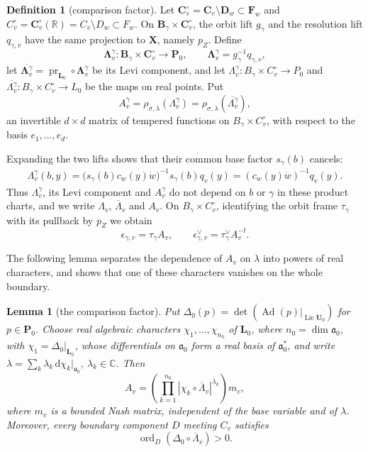 \documentclass[a4paper,12pt]{amsart}
\numberwithin{equation}{section}
\newtheorem{lemma}[theorem]{Lemma}
\theoremstyle{definition}
\newtheorem{definition}[theorem]{Definition}
\theoremstyle{remark}
\newcommand{\pP}{\mathbf P}
\newcommand{\lL}{\mathbf L}
\newcommand{\U}{\mathbf U}
\newcommand{\X}{\mathbf X}
\newcommand{\F}{\mathbf F}
\newcommand{\D}{\mathbf D}
\newcommand{\B}{\mathbf B}
\newcommand{\R}{\mathbb R}
\newcommand{\C}{\mathbb C}
\newcommand{\fa}{\mathfrak a}
\newcommand{\Ad}{\operatorname{Ad}}
\newcommand{\Lie}{\operatorname{Lie}}
\newcommand{\ord}{\operatorname{ord}}
\newcommand{\pr}{\operatorname{pr}}
\newcommand{\dd}{\mathrm d}
\newcommand{\cC}{\mathbf C}
\newcommand{\lLd}{\boldsymbol\Lambda}
\begin{document}
\begin{definition}[comparison factor]\label{def:comparison}
Let $\cC_v^\circ=\cC_v\setminus\D_w\subset\F_w$ and $C_v^\circ=\cC_v^\circ(\R)=C_v\setminus D_w\subset F_w$. On $\B_\gamma\times\cC_v^\circ$, the orbit lift $g_\gamma$ and the resolution lift $q_{\gamma,v}$ have the same projection to $\X$, namely $p_Z$. Define
\[
 \lLd^\gamma_v:\B_\gamma\times\cC_v^\circ\to\pP_0,\qquad
 \lLd^\gamma_v=g_\gamma^{-1}q_{\gamma,v},
\]
let $\overline{\lLd^\gamma_v}=\pr_{\lL_0}\circ\lLd^\gamma_v$ be its Levi component, and let $\Lambda^\gamma_v:B_\gamma\times C_v^\circ\to P_0$ and $\overline{\Lambda^\gamma_v}:B_\gamma\times C_v^\circ\to L_0$ be the maps on real points. Put
\[
 A^\gamma_v=\rho_{\sigma,\lambda}(\Lambda^\gamma_v)=\rho_{\sigma,\lambda}(\overline{\Lambda^\gamma_v}),
\]
an invertible $d\times d$ matrix of tempered functions on $B_\gamma\times C_v^\circ$, with respect to the basis $e_1,\dots,e_d$.
\end{definition}

Expanding the two lifts shows that their common base factor $s_\gamma(b)$ cancels:
\begin{equation}\label{eq:base-lift-cancels}
\begin{aligned}
 \Lambda^\gamma_v(b,y)
 =\bigl(s_\gamma(b)c_w(y)\dot w\bigr)^{-1}s_\gamma(b)q_v(y)
 =(c_w(y)\dot w)^{-1}q_v(y).
\end{aligned}
\end{equation}
Thus $\Lambda^\gamma_v$, its Levi component and $A^\gamma_v$ do not depend on $b$ or $\gamma$ in these product charts, and we write $\Lambda_v$, $\overline\Lambda_v$ and $A_v$. On $B_\gamma\times C_v^\circ$, identifying the orbit frame $\tau_\gamma$ with its pullback by $p_Z$ we obtain
\begin{equation}\label{eq:eps-tau}
 \epsilon_{\gamma,v}=\tau_\gamma A_v,\qquad
 \epsilon_{\gamma,v}^\vee=\tau_\gamma^\vee A_v^{-t}.
\end{equation}

The following lemma separates the dependence of $A_v$ on $\lambda$ into powers of real characters, and shows that one of these characters vanishes on the whole boundary.

\begin{lemma}[the comparison factor]\label{lem:comparison}
Put $\Delta_0(p)=\det(\Ad(p)|_{\Lie\U_0})$ for $p\in\pP_0$. Choose real algebraic characters $\chi_1,\dots,\chi_{n_0}$ of $\lL_0$, where $n_0=\dim\fa_0$, with $\chi_1=\Delta_0|_{\lL_0}$, whose differentials on $\fa_0$ form a real basis of $\fa_0^*$, and write $\lambda=\sum_k\lambda_k\,\dd\chi_k|_{\fa_0}, \ \lambda_k\in \C$. Then
\[
 A_v=\left(\prod_{k=1}^{n_0}|\chi_k\circ\overline\Lambda_v|^{\lambda_k}\right)m_v,
\]
where $m_v$ is a bounded Nash matrix, independent of the base variable and of $\lambda$. Moreover, every boundary component $D$ meeting $C_v$ satisfies
\begin{equation}\label{eq:positive-Delta-order}
 \ord_D(\Delta_0\circ\overline\Lambda_v)>0.
\end{equation}
\end{lemma}
\end{document}
